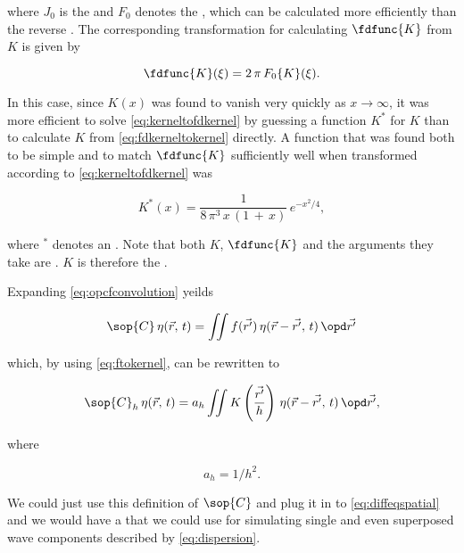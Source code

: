 where $J_0$ is the  and $F_0$ denotes the , which can be calculated more efficiently than the reverse . The corresponding transformation for calculating $\fdfunc{K}$ from $K$ is given by

\begin{equation} \label{eq:kerneltofdkernel}
\fdfunc{K}(\xi) = 2\,\pi\,F_0\{K\}(\xi).
\end{equation}

In this case, since $K(x)$ was found to vanish very quickly as $x\rightarrow\infty$, it was more efficient to solve \eqref{eq:kerneltofdkernel} by guessing a function $K^*$ for $K$ than to calculate $K$ from \eqref{eq:fdkerneltokernel} directly. A function that was found both to be simple and to match $\fdfunc{K}$ sufficiently well when transformed according to \eqref{eq:kerneltofdkernel} was

\begin{equation} \label{eq:empirical}
K^*(x) = \frac{1}{8\,\pi^3\,x\,(1\,+\,x)}\,e^{-x^2/4},
\end{equation}

where $^*$ denotes an \estimate. Note that both $K$, $\fdfunc{K}$ and the arguments they take are . $K$ is therefore the .

%
%

Expanding \eqref{eq:opcfconvolution} yeilds

\begin{equation} \label{eq:opcfintegral}
\sop{C}\,\eta(\vec{r},\,t) = \iint f(\vec{r'})\,\eta(\vec{r}-\vec{r'},\,t)\,\opd\vec{r'}
\end{equation}

which, by using \eqref{eq:ftokernel}, can be rewritten to

\begin{equation} \label{eq:opchunknown}
\sop{C}_h\,\eta(\vec{r},\,t) = a_h\iint K\left(\frac{\vec{r'}}{h}\right)\,\eta(\vec{r}-\vec{r'},\,t)\,\opd\vec{r'},
\end{equation}

where

\begin{equation} \label{eq:aofh}
a_h = 1/h^2.
\end{equation}

We could just use this definition of $\sop{C}$ and plug it in to \eqref{eq:diffeqspatial} and we would have a \PDE that we could use for simulating single and even superposed wave components described by \eqref{eq:dispersion}.

